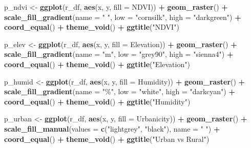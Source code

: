 \documentclass[
  letterpaper,
]{krantz}
\newenvironment{Shaded}{\begin{snugshade}}{\end{snugshade}}
\newcommand{\AttributeTok}[1]{\textcolor[rgb]{0.13,0.29,0.53}{#1}}
\newcommand{\FunctionTok}[1]{\textcolor[rgb]{0.13,0.29,0.53}{\textbf{#1}}}
\newcommand{\NormalTok}[1]{#1}
\newcommand{\OtherTok}[1]{\textcolor[rgb]{0.56,0.35,0.01}{#1}}
\newcommand{\SpecialCharTok}[1]{\textcolor[rgb]{0.81,0.36,0.00}{\textbf{#1}}}
\newcommand{\StringTok}[1]{\textcolor[rgb]{0.31,0.60,0.02}{#1}}
\begin{document}
\begin{Shaded}
\begin{Highlighting}[]
\NormalTok{p\_ndvi }\OtherTok{\textless{}{-}} \FunctionTok{ggplot}\NormalTok{(r\_df, }\FunctionTok{aes}\NormalTok{(x, y, }\AttributeTok{fill =}\NormalTok{ NDVI)) }\SpecialCharTok{+}
  \FunctionTok{geom\_raster}\NormalTok{() }\SpecialCharTok{+}
  \FunctionTok{scale\_fill\_gradient}\NormalTok{(}\AttributeTok{name =} \StringTok{" "}\NormalTok{, }\AttributeTok{low =} \StringTok{"cornsilk"}\NormalTok{, }\AttributeTok{high =} \StringTok{"darkgreen"}\NormalTok{) }\SpecialCharTok{+}
  \FunctionTok{coord\_equal}\NormalTok{() }\SpecialCharTok{+} \FunctionTok{theme\_void}\NormalTok{() }\SpecialCharTok{+} \FunctionTok{ggtitle}\NormalTok{(}\StringTok{"NDVI"}\NormalTok{)}

\NormalTok{p\_elev }\OtherTok{\textless{}{-}} \FunctionTok{ggplot}\NormalTok{(r\_df, }\FunctionTok{aes}\NormalTok{(x, y, }\AttributeTok{fill =}\NormalTok{ Elevation)) }\SpecialCharTok{+}
  \FunctionTok{geom\_raster}\NormalTok{() }\SpecialCharTok{+}
  \FunctionTok{scale\_fill\_gradient}\NormalTok{(}\AttributeTok{name =} \StringTok{"m"}\NormalTok{, }\AttributeTok{low =} \StringTok{"grey90"}\NormalTok{, }\AttributeTok{high =} \StringTok{"sienna4"}\NormalTok{) }\SpecialCharTok{+}
  \FunctionTok{coord\_equal}\NormalTok{() }\SpecialCharTok{+} \FunctionTok{theme\_void}\NormalTok{() }\SpecialCharTok{+} \FunctionTok{ggtitle}\NormalTok{(}\StringTok{"Elevation"}\NormalTok{)}

\NormalTok{p\_humid }\OtherTok{\textless{}{-}} \FunctionTok{ggplot}\NormalTok{(r\_df, }\FunctionTok{aes}\NormalTok{(x, y, }\AttributeTok{fill =}\NormalTok{ Humidity)) }\SpecialCharTok{+}
  \FunctionTok{geom\_raster}\NormalTok{() }\SpecialCharTok{+}
  \FunctionTok{scale\_fill\_gradient}\NormalTok{(}\AttributeTok{name =} \StringTok{"\%"}\NormalTok{, }\AttributeTok{low =} \StringTok{"white"}\NormalTok{, }\AttributeTok{high =} \StringTok{"darkcyan"}\NormalTok{) }\SpecialCharTok{+}
  \FunctionTok{coord\_equal}\NormalTok{() }\SpecialCharTok{+} \FunctionTok{theme\_void}\NormalTok{() }\SpecialCharTok{+} \FunctionTok{ggtitle}\NormalTok{(}\StringTok{"Humidity"}\NormalTok{)}

\NormalTok{p\_urban }\OtherTok{\textless{}{-}} \FunctionTok{ggplot}\NormalTok{(r\_df, }\FunctionTok{aes}\NormalTok{(x, y, }\AttributeTok{fill =}\NormalTok{ Urbanicity)) }\SpecialCharTok{+}
  \FunctionTok{geom\_raster}\NormalTok{() }\SpecialCharTok{+}
  \FunctionTok{scale\_fill\_manual}\NormalTok{(}\AttributeTok{values =} \FunctionTok{c}\NormalTok{(}\StringTok{"lightgrey"}\NormalTok{, }\StringTok{"black"}\NormalTok{),}
                    \AttributeTok{name =} \StringTok{" "}\NormalTok{) }\SpecialCharTok{+}
  \FunctionTok{coord\_equal}\NormalTok{() }\SpecialCharTok{+} \FunctionTok{theme\_void}\NormalTok{() }\SpecialCharTok{+} \FunctionTok{ggtitle}\NormalTok{(}\StringTok{"Urban vs Rural"}\NormalTok{)}


\end{Highlighting}
\end{Shaded}
\end{document}
